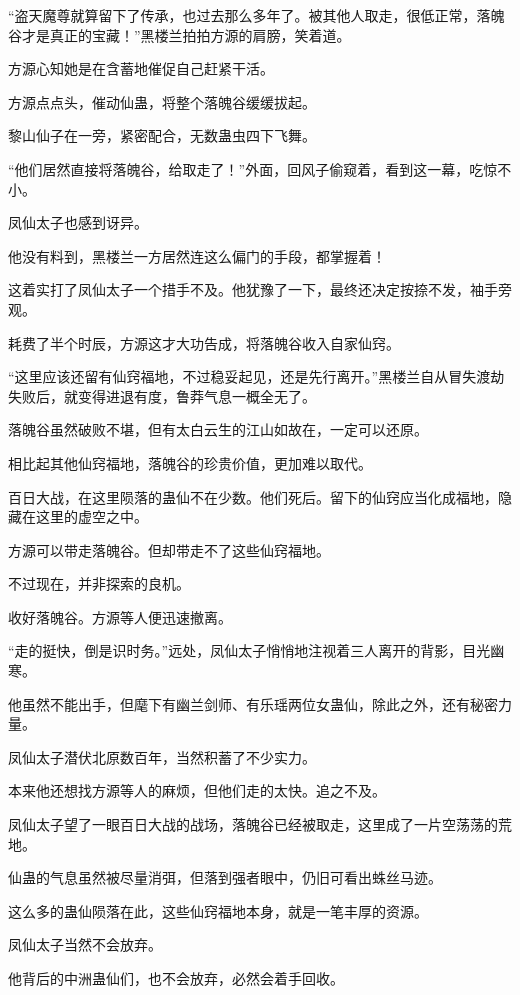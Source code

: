 \begin{this_body}
“盗天魔尊就算留下了传承，也过去那么多年了。被其他人取走，很低正常，落魄谷才是真正的宝藏！”黑楼兰拍拍方源的肩膀，笑着道。

方源心知她是在含蓄地催促自己赶紧干活。

方源点点头，催动仙蛊，将整个落魄谷缓缓拔起。

黎山仙子在一旁，紧密配合，无数蛊虫四下飞舞。

“他们居然直接将落魄谷，给取走了！”外面，回风子偷窥着，看到这一幕，吃惊不小。

凤仙太子也感到讶异。

他没有料到，黑楼兰一方居然连这么偏门的手段，都掌握着！

这着实打了凤仙太子一个措手不及。他犹豫了一下，最终还决定按捺不发，袖手旁观。

耗费了半个时辰，方源这才大功告成，将落魄谷收入自家仙窍。

“这里应该还留有仙窍福地，不过稳妥起见，还是先行离开。”黑楼兰自从冒失渡劫失败后，就变得进退有度，鲁莽气息一概全无了。

落魄谷虽然破败不堪，但有太白云生的江山如故在，一定可以还原。

相比起其他仙窍福地，落魄谷的珍贵价值，更加难以取代。

百日大战，在这里陨落的蛊仙不在少数。他们死后。留下的仙窍应当化成福地，隐藏在这里的虚空之中。

方源可以带走落魄谷。但却带走不了这些仙窍福地。

不过现在，并非探索的良机。

收好落魄谷。方源等人便迅速撤离。

“走的挺快，倒是识时务。”远处，凤仙太子悄悄地注视着三人离开的背影，目光幽寒。

他虽然不能出手，但麾下有幽兰剑师、有乐瑶两位女蛊仙，除此之外，还有秘密力量。

凤仙太子潜伏北原数百年，当然积蓄了不少实力。

本来他还想找方源等人的麻烦，但他们走的太快。追之不及。

凤仙太子望了一眼百日大战的战场，落魄谷已经被取走，这里成了一片空荡荡的荒地。

仙蛊的气息虽然被尽量消弭，但落到强者眼中，仍旧可看出蛛丝马迹。

这么多的蛊仙陨落在此，这些仙窍福地本身，就是一笔丰厚的资源。

凤仙太子当然不会放弃。

他背后的中洲蛊仙们，也不会放弃，必然会着手回收。


\end{this_body}
